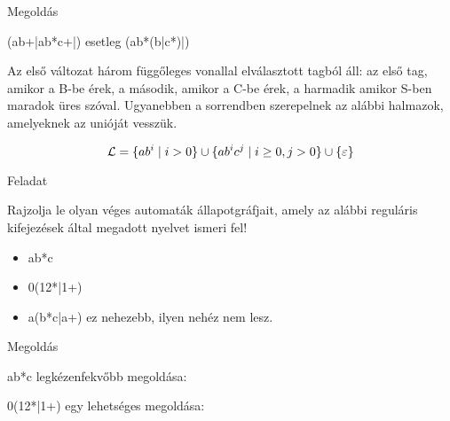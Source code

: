 \documentclass[
    ignorenonframetext
    ]{beamer}
\begin{document}
\begin{frame}
    {Megoldás}

    (ab+|ab*c+|) \quad esetleg \quad (ab*(b|c*)|)

    Az első változat három függőleges vonallal elválasztott tagból áll:
    az első tag, amikor a B-be érek, a második, amikor a C-be érek, a
    harmadik amikor S-ben maradok üres szóval. Ugyanebben a sorrendben
    szerepelnek az alábbi halmazok, amelyeknek az unióját vesszük.


    \[{\cal L} = \{ab^i \mid i>0\} \cup \{ab^ic^j \mid i \ge 0, j>0\}
    \cup \{\varepsilon\} \]
\end{frame}

\begin{frame}
    {Feladat}

    Rajzolja le olyan véges automaták állapotgráfjait, amely az alábbi
    reguláris kifejezések által megadott nyelvet ismeri fel!

    \begin{itemize}
        \item ab*c
        \item 0(12*|1+)
        \item a(b*c|a+)  ez nehezebb, ilyen nehéz nem lesz.
    \end{itemize}

    \megoldasjon
\end{frame}


\begin{frame}
    {Megoldás}

    ab*c legkézenfekvőbb megoldása:


\vfill
    0(12*|1+) egy lehetséges megoldása:

\end{frame}
\end{document}
